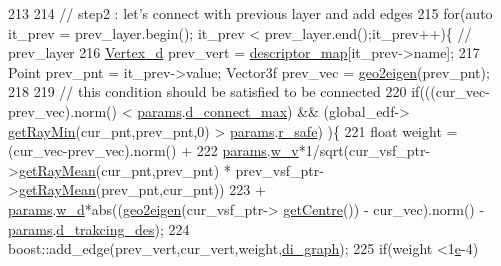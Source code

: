\begin{DoxyCode}
213             
214             \textcolor{comment}{// step2 : let's connect with previous layer and add edges }
215             \textcolor{keywordflow}{for}(\textcolor{keyword}{auto} it\_prev = prev\_layer.begin(); it\_prev < prev\_layer.end();it\_prev++)\{ \textcolor{comment}{// prev\_layer }
216                 \hyperlink{_common_8h_a1f671d518f573b692b5efa57ed576f36}{Vertex\_d} prev\_vert = \hyperlink{class_preplanner_a45603cfb24429584c4fc8bc42474e1ff}{descriptor\_map}[it\_prev->name];
217                 Point prev\_pnt = it\_prev->value; Vector3f prev\_vec = \hyperlink{_common_8h_a3e35de4eb7396984c2c5018768885d91}{geo2eigen}(prev\_pnt);
218 
219                 \textcolor{comment}{// this condition should be satisfied to be connected }
220                 \textcolor{keywordflow}{if}(((cur\_vec-prev\_vec).norm() < \hyperlink{class_preplanner_a679cc4b70f041aff73769e7ec92dc5d0}{params}.\hyperlink{structchaser_1_1_preplanner_params_a90021bd30b7e88b50cf9317ff3673482}{d\_connect\_max}) && (global\_edf->
      \hyperlink{struct_grid_field_af9f5144af2f0cdb99784ea54c42a8516}{getRayMin}(cur\_pnt,prev\_pnt,0) > \hyperlink{class_preplanner_a679cc4b70f041aff73769e7ec92dc5d0}{params}.\hyperlink{structchaser_1_1_preplanner_params_a409be3b01b1b4853919d5b34e529c49a}{r\_safe}) )\{
221                     \textcolor{keywordtype}{float} weight = (cur\_vec-prev\_vec).norm() + 
222                             \hyperlink{class_preplanner_a679cc4b70f041aff73769e7ec92dc5d0}{params}.\hyperlink{structchaser_1_1_preplanner_params_a1778793e5b16806c867291c1a5471a04}{w\_v}*1/sqrt(cur\_vsf\_ptr->\hyperlink{struct_grid_field_a3e49ca50129cb18db833bd4168c5d254}{getRayMean}(cur\_pnt,prev\_pnt) 
      * prev\_vsf\_ptr->\hyperlink{struct_grid_field_a3e49ca50129cb18db833bd4168c5d254}{getRayMean}(prev\_pnt,cur\_pnt)) 
223                             + \hyperlink{class_preplanner_a679cc4b70f041aff73769e7ec92dc5d0}{params}.\hyperlink{structchaser_1_1_preplanner_params_ae443edaa7e2912a6a7643272305c91f5}{w\_d}*abs((\hyperlink{_common_8h_a3e35de4eb7396984c2c5018768885d91}{geo2eigen}(cur\_vsf\_ptr->
      \hyperlink{struct_grid_field_aacd39f9388090694e5c428cc612fd887}{getCentre}()) - cur\_vec).norm() - \hyperlink{class_preplanner_a679cc4b70f041aff73769e7ec92dc5d0}{params}.\hyperlink{structchaser_1_1_preplanner_params_a6a950244cbb256abb9a4e93388c0177f}{d\_trakcing\_des});                     
224                     boost::add\_edge(prev\_vert,cur\_vert,weight,\hyperlink{class_preplanner_af588e8495d5e78dd5a746f7c640daa4d}{di\_graph});
225                     \textcolor{keywordflow}{if}(weight <1\hyperlink{namespace__setup__util_acdce690b925de33d6249bbbfa1109d61}{e}-4)

\end{DoxyCode}
